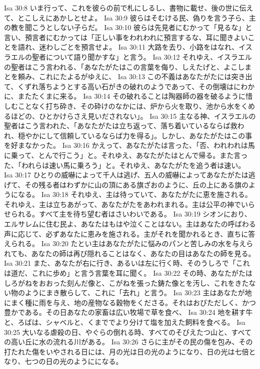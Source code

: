 Isa 30:8  いま行って、これを彼らの前で札にしるし、書物に載せ、後の世に伝えて、とこしえにあかしとせよ。
Isa 30:9  彼らはそむける民、偽りを言う子ら、主の教を聞こうとしない子らだ。
Isa 30:10  彼らは先見者にむかって「見るな」と言い、預言者にむかっては「正しい事をわれわれに預言するな、耳に聞きよいことを語れ、迷わしごとを預言せよ。
Isa 30:11  大路を去り、小路をはなれ、イスラエルの聖者について語り聞かすな」と言う。
Isa 30:12  それゆえ、イスラエルの聖者はこう言われる、「あなたがたはこの言葉を侮り、しえたげと、よこしまとを頼み、これにたよるがゆえに、
Isa 30:13  この不義はあなたがたには突き出て、くずれ落ちようとする高い石がきの破れのようであって、その倒壊はにわかに、またたくまに来る。
Isa 30:14  その破れることは陶器師の器を破るように惜しむことなく打ち砕き、その砕けのなかには、炉から火を取り、池から水をくめるほどの、ひとかけらさえ見いだされない」。
Isa 30:15  主なる神、イスラエルの聖者はこう言われた、「あなたがたは立ち返って、落ち着いているならば救われ、穏やかにして信頼しているならば力を得る」。しかし、あなたがたはこの事を好まなかった。
Isa 30:16  かえって、あなたがたは言った、「否、われわれは馬に乗って、とんで行こう」と。それゆえ、あなたがたはとんで帰る。また言った、「われらは速い馬に乗ろう」と。それゆえ、あなたがたを追う者は速い。
Isa 30:17  ひとりの威嚇によって千人は逃げ、五人の威嚇によってあなたがたは逃げて、その残る者はわずかに山の頂にある旗ざおのように、丘の上にある旗のようになる。
Isa 30:18  それゆえ、主は待っていて、あなたがたに恵を施される。それゆえ、主は立ちあがって、あなたがたをあわれまれる。主は公平の神でいらせられる。すべて主を待ち望む者はさいわいである。
Isa 30:19  シオンにおり、エルサレムに住む民よ、あなたはもはや泣くことはない。主はあなたの呼ばわる声に応じて、必ずあなたに恵みを施される。主がそれを聞かれるとき、直ちに答えられる。
Isa 30:20  たとい主はあなたがたに悩みのパンと苦しみの水を与えられても、あなたの師は再び隠れることはなく、あなたの目はあなたの師を見る。
Isa 30:21  また、あなたが右に行き、あるいは左に行く時、そのうしろで「これは道だ、これに歩め」と言う言葉を耳に聞く。
Isa 30:22  その時、あなたがたはしろがねをおおった刻んだ像と、こがねを張った鋳た像とを汚し、これをきたない物のようにまき散らして、これに「去れ」と言う。
Isa 30:23  主はあなたが地にまく種に雨を与え、地の産物なる穀物をくださる。それはおびただしく、かつ豊かである。その日あなたの家畜は広い牧場で草を食べ、
Isa 30:24  地を耕す牛と、ろばは、シャベルと、くまででより分けて塩を加えた飼料を食べる。
Isa 30:25  大いなる虐殺の日、やぐらの倒れる時、すべてのそびえたつ山と、すべての高い丘に水の流れる川がある。
Isa 30:26  さらに主がその民の傷を包み、その打たれた傷をいやされる日には、月の光は日の光のようになり、日の光は七倍となり、七つの日の光のようにになる。
